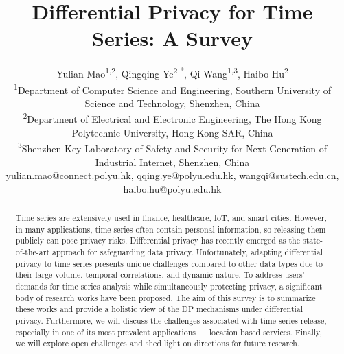 \documentclass[11pt]{article}
\begin{document}

\title{Differential Privacy for Time Series: A Survey}

\author{Yulian Mao\textsuperscript{1,2}, Qingqing Ye\textsuperscript{2 *}, Qi Wang\textsuperscript{1,3}, Haibo Hu\textsuperscript{2}\\
	\textsuperscript{1}\small{Department of Computer Science and  Engineering, Southern University of Science and Technology, Shenzhen, China}\\
	\textsuperscript{2}\small{Department of Electrical and Electronic Engineering, The Hong Kong Polytechnic University, Hong Kong SAR, China}\\
	\textsuperscript{3}\small{Shenzhen Key Laboratory of Safety and Security for Next Generation of Industrial Internet,  Shenzhen, China}\\
	\small{yulian.mao@connect.polyu.hk, qqing.ye@polyu.edu.hk, wangqi@sustech.edu.cn, haibo.hu@polyu.edu.hk}
}

\maketitle

\begin{abstract}
Time series are extensively used in finance, healthcare, IoT, and smart cities. However, in many applications, time series often contain personal information, so releasing them publicly can pose privacy risks. Differential privacy has recently emerged as the state-of-the-art approach for safeguarding data privacy. Unfortunately, adapting differential privacy to time series presents unique challenges compared to other data types due to their large volume, temporal correlations, and dynamic nature. To address users' demands for time series analysis while simultaneously protecting privacy, a significant body of research works have been proposed. The aim of this survey is to summarize these works and provide a holistic view of the DP mechanisms under differential privacy. Furthermore, we will discuss the challenges associated with time series release, especially in one of its most prevalent applications --- location based services. Finally, we will explore open challenges and shed light on directions for future research.


\end{abstract}

\end{document}
